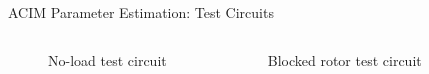 \begin{frame}{ACIM Parameter Estimation: Test Circuits}
	\begin{columns}
		\begin{figure}
		  \centering
		  \caption{No-load test circuit}
		\end{figure}
		\begin{figure}
		  \centering
		  \caption{Blocked rotor test circuit}
		\end{figure}
	\end{columns}
  \end{frame}

